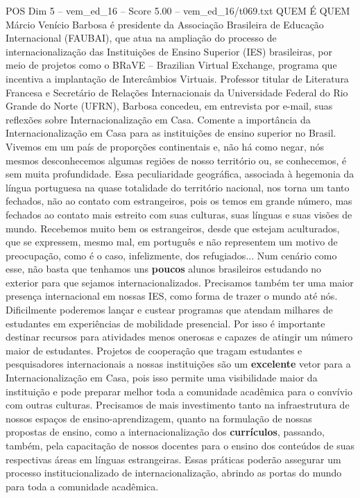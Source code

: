 \begin{textsample}{POS Dim 5 – vem\_ed\_16 – Score 5.00 – vem\_ed\_16/t069.txt}  \label{ex:f5_pos_058}
QUEM É QUEM Márcio Venício Barbosa é presidente da Associação Brasileira de Educação Internacional (FAUBAI), que atua na ampliação do processo de internacionalização das Instituições de Ensino Superior (IES) brasileiras, por meio de projetos como o BRaVE – Brazilian Virtual Exchange, programa que incentiva a implantação de Intercâmbios Virtuais.
Professor titular de Literatura Francesa e Secretário de Relações Internacionais da Universidade Federal do Rio Grande do Norte (UFRN), Barbosa concedeu, em entrevista por e-mail, suas reflexões sobre Internacionalização em Casa.
Comente a importância da Internacionalização em Casa para as instituições de ensino superior no Brasil.
Vivemos em um país de proporções continentais e, não há como negar, nós mesmos desconhecemos algumas regiões de nosso território ou, se conhecemos, é sem muita profundidade.
Essa peculiaridade geográfica, associada à hegemonia da língua portuguesa na quase totalidade do território nacional, nos torna um tanto fechados, não ao contato com estrangeiros, pois os temos em grande número, mas fechados ao contato mais estreito com suas culturas, suas línguas e suas visões de mundo.
Recebemos muito bem os estrangeiros, desde que estejam aculturados, que se expressem, mesmo mal, em português e não representem um motivo de preocupação, como é o caso, infelizmente, dos refugiados...
Num cenário como esse, não basta que tenhamos uns \textbf{poucos} alunos brasileiros estudando no exterior para que sejamos internacionalizados.
Precisamos também ter uma maior presença internacional em nossas IES, como forma de trazer o mundo até nós.
Dificilmente poderemos lançar e custear programas que atendam milhares de estudantes em experiências de mobilidade presencial.
Por isso é importante destinar recursos para atividades menos onerosas e capazes de atingir um número maior de estudantes.
Projetos de cooperação que tragam estudantes e pesquisadores internacionais a nossas instituições são um \textbf{excelente} vetor para a Internacionalização em Casa, pois isso permite uma visibilidade maior da instituição e pode preparar melhor toda a comunidade acadêmica para o convívio com outras culturas.
Precisamos de mais investimento tanto na infraestrutura de nossos espaços de ensino-aprendizagem, quanto na formulação de nossas propostas de ensino, como a internacionalização dos \textbf{currículos}, passando, também, pela capacitação de nossos docentes para o ensino dos conteúdos de suas respectivas áreas em línguas estrangeiras.
Essas práticas poderão assegurar um processo institucionalizado de internacionalização, abrindo as portas do mundo para toda a comunidade acadêmica.

\end{textsample}
